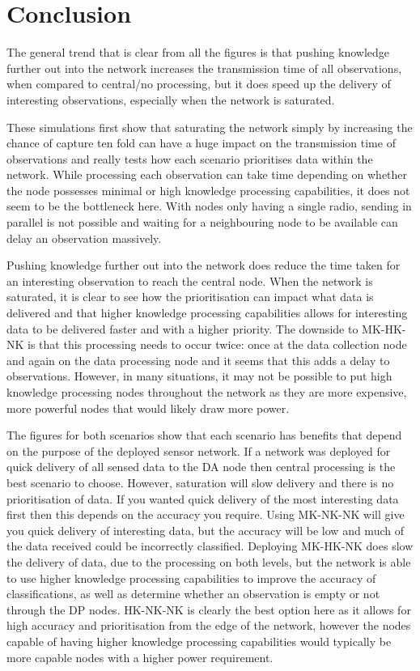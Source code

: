 \section{Conclusion}\label{sim:conc}
The general trend that is clear from all the figures is that pushing knowledge further out into the network increases the transmission time of all observations, when compared to central/no processing, but it does speed up the delivery of interesting observations, especially when the network is saturated.

These simulations first show that saturating the network simply by increasing the chance of capture ten fold can have a huge impact on the transmission time of observations and really tests how each scenario prioritises data within the network. While processing each observation can take time depending on whether the node possesses minimal or high knowledge processing capabilities, it does not seem to be the bottleneck here. With nodes only having a single radio, sending in parallel is not possible and waiting for a neighbouring node to be available can delay an observation massively.

Pushing knowledge further out into the network does reduce the time taken for an interesting observation to reach the central node. When the network is saturated, it is clear to see how the prioritisation can impact what data is delivered and that higher knowledge processing capabilities allows for interesting data to be delivered faster and with a higher priority. The downside to MK-HK-NK is that this processing needs to occur twice: once at the data collection node and again on the data processing node and it seems that this adds a delay to observations. However, in many situations, it may not be possible to put high knowledge processing nodes throughout the network as they are more expensive, more powerful nodes that would likely draw more power.

The figures for both scenarios show that each scenario has benefits that depend on the purpose of the deployed sensor network. If a network was deployed for quick delivery of all sensed data to the DA node then central processing is the best scenario to choose. However, saturation will slow delivery and there is no prioritisation of data. If you wanted quick delivery of the most interesting data first then this depends on the accuracy you require. Using MK-NK-NK will give you quick delivery of interesting data, but the accuracy will be low and much of the data received could be incorrectly classified. Deploying MK-HK-NK does slow the delivery of data, due to the processing on both levels, but the network is able to use higher knowledge processing capabilities to improve the accuracy of classifications, as well as determine whether an observation is empty or not through the DP nodes. HK-NK-NK is clearly the best option here as it allows for high accuracy and prioritisation from the edge of the network, however the nodes capable of having higher knowledge processing capabilities would typically be more capable nodes with a higher power requirement.



